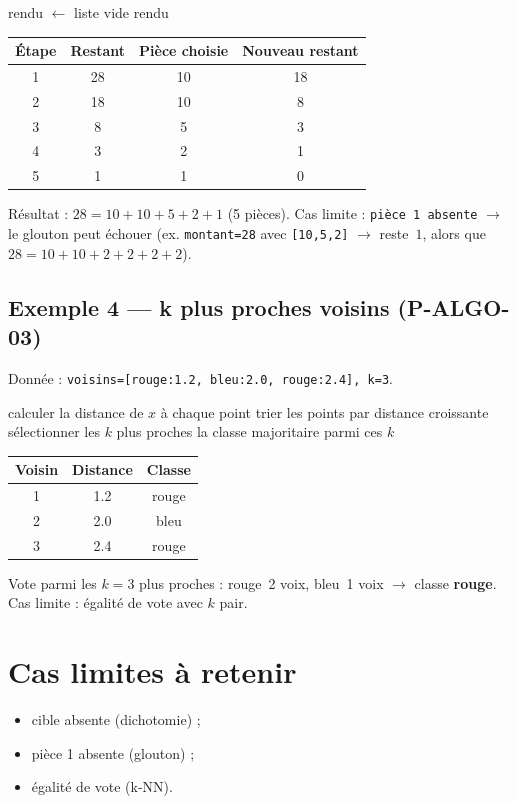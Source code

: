 \documentclass[a4paper,11pt]{article}
\begin{document}
\begin{algorithm}[H]
\SetAlgoLined
\DontPrintSemicolon
{}
rendu $\leftarrow$ liste vide\;
\Return rendu\;
\caption{Rendu de monnaie glouton}
\end{algorithm}

\medskip
\begin{center}
\begin{tabular}{cccc}
\toprule
Étape & Restant & Pièce choisie & Nouveau restant \\
\midrule
1 & 28 & 10 & 18 \\
2 & 18 & 10 & 8 \\
3 & 8 & 5 & 3 \\
4 & 3 & 2 & 1 \\
5 & 1 & 1 & 0 \\
\bottomrule
\end{tabular}
\end{center}
Résultat : $28 = 10 + 10 + 5 + 2 + 1$ (5 pièces). Cas limite : \texttt{pièce 1 absente} $\rightarrow$ le glouton peut échouer (ex. \texttt{montant=28} avec \texttt{[10,5,2]} $\rightarrow$ reste~$1$, alors que $28=10{+}10{+}2{+}2{+}2{+}2$).

\subsection*{Exemple 4 — k plus proches voisins (P-ALGO-03)}
Donnée : \texttt{voisins=[rouge:1.2, bleu:2.0, rouge:2.4], k=3}.

\begin{algorithm}[H]
\SetAlgoLined
\DontPrintSemicolon
{}
calculer la distance de $x$ à chaque point\;
trier les points par distance croissante\;
sélectionner les $k$ plus proches\;
\Return la classe majoritaire parmi ces $k$\;
\caption{Vote des $k$ plus proches voisins}
\end{algorithm}

\medskip
\begin{center}
\begin{tabular}{ccc}
\toprule
Voisin & Distance & Classe \\
\midrule
1 & 1.2 & rouge \\
2 & 2.0 & bleu \\
3 & 2.4 & rouge \\
\bottomrule
\end{tabular}
\end{center}
Vote parmi les $k=3$ plus proches : rouge~2 voix, bleu~1 voix $\rightarrow$ classe \textbf{rouge}. Cas limite : égalité de vote avec $k$ pair.

\section*{Cas limites à retenir}
\begin{itemize}[nosep]
  \item cible absente (dichotomie) ; \item pièce 1 absente (glouton) ; \item égalité de vote (k-NN).
\end{itemize}
\end{document}

